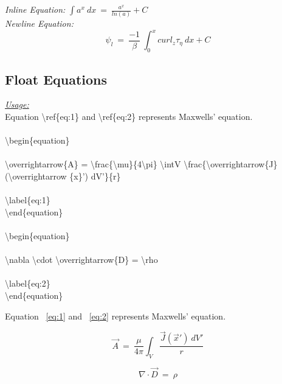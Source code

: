 \documentclass[12pt, twocolumn]{article}
\begin{document}
 
 \noindent \textit{Inline Equation: } $ \int a^x ~ dx ~ = ~ \frac{a^x}{ln(a)} + C $ \\
 \textit{Newline Equation: } \[ \psi_l ~ = ~ \frac{-1}{\beta} ~ \int^x_0 curl_z \tau_\eta ~ dx + C \]

 \subsection{Float Equations}

 \noindent \underline{\textit{Usage:}} \\
 
 \noindent Equation \textbackslash ref\{eq:1\} and \textbackslash ref\{eq:2\} represents Maxwells' equation. \\ \\
 
 \noindent \textbackslash begin\{equation\} \\ \\
 \textbackslash overrightarrow\{A\} = \textbackslash frac\{\textbackslash mu\}\{4\textbackslash pi\} \textbackslash int\textunderscore V \textbackslash frac\{\textbackslash overrightarrow\{J\} (\textbackslash overrightarrow \{x\}') dV'\}\{r\} \\ \\
 \textbackslash label\{eq:1\} \\
 \textbackslash end\{equation\} \\ \\

\noindent \textbackslash begin\{equation\} \\ \\
 \textbackslash nabla \textbackslash cdot \textbackslash overrightarrow\{D\} = \textbackslash rho \\ \\
 \textbackslash label\{eq:2\} \\
 \textbackslash end\{equation\}
 
 
  \begin{center}
  \big\Downarrow
 \end{center}

 Equation ~\ref{eq:1} and ~\ref{eq:2} represents Maxwells' equation.
 
 \begin{equation}
 \overrightarrow{A} ~ = ~ \frac{\mu}{4\pi} \int_V \frac{\overrightarrow{J} (\overrightarrow{x}') ~ dV'}{r}
 \label{eq:1}
 \end{equation}

 \begin{equation}
 \nabla \cdot \overrightarrow{D} ~ = ~ \rho
 \label{eq:2}
 \end{equation}
\end{document}
